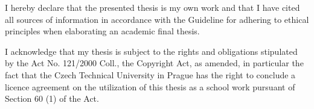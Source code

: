 \documentclass[english,master,unicode,oneside]{ctufit-thesis.c}
\theoremstyle{plain}
\theoremstyle{definition}
\theoremstyle{remark}
\theoremstyle{definition}
\numberwithin{theorem}{chapter}
\begin{document}
\begin{declarationpage}
  I hereby declare that the presented thesis is my own work and that I have cited all sources of
  information in accordance with the Guideline for adhering to ethical principles when elaborating an
  academic final thesis.

  I acknowledge that my thesis is subject to the rights and obligations stipulated by the Act No.
  121/2000 Coll., the Copyright Act, as amended, in particular the fact that the Czech Technical
  University in Prague has the right to conclude a licence agreement on the utilization of this thesis as
  a school work pursuant of Section 60 (1) of the Act.
\end{declarationpage}

\printabstractpage %

% 
% 
% 
% 
% 
% 
% 
% 
% 
\end{document}
